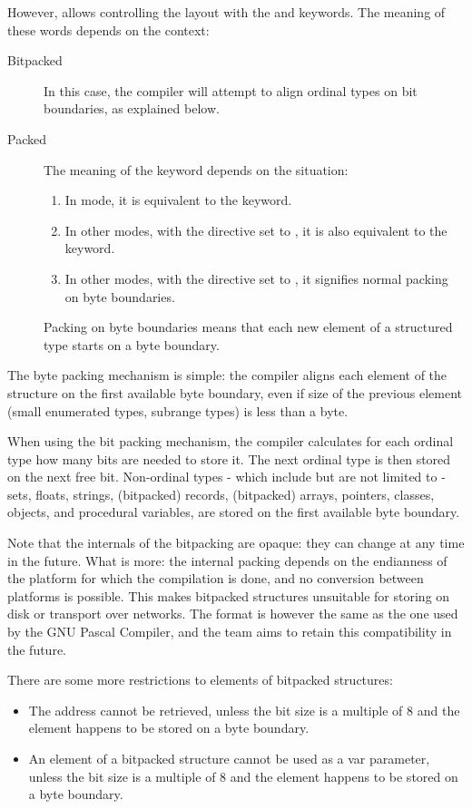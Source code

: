 However, \fpc allows controlling the layout with the  and
 keywords. The meaning of these words depends on the context:
\begin{description}
\item[Bitpacked] In this case, the compiler will attempt to align ordinal
types on bit boundaries, as explained below.
\item[Packed] The meaning of the  keyword depends on the
situation:
\begin{enumerate}
\item In  mode, it is equivalent to the  keyword.
\item In other modes, with the  directive set to ,
it is also equivalent to the  keyword.
\item In other modes, with the  directive set to ,
it signifies normal packing on byte boundaries.
\end{enumerate}
Packing on byte boundaries means that each new element of a structured type
starts on a byte boundary.
\end{description}

The byte packing mechanism is simple: the compiler aligns each element of
the structure on the first available byte boundary, even if size of the
previous element (small enumerated types, subrange types) is less than a
byte.

When using the bit packing mechanism, the compiler calculates for each
ordinal type how many bits are needed to store it. The next ordinal type
is then stored on the next free bit. Non-ordinal types - which include but
are not limited to - sets, floats, strings, (bitpacked) records, (bitpacked)
arrays, pointers, classes, objects, and procedural variables, are stored
on the first available byte boundary.

Note that the internals of the bitpacking are opaque: they can change
at any time in the future. What is more: the internal packing depends
on the endianness of the platform for which the compilation is done,
and no conversion between platforms is possible. This makes bitpacked
structures unsuitable for storing on disk or transport over networks.
The format is however the same as the one used by the GNU Pascal
Compiler, and the \fpc team aims to retain this compatibility in the future.

There are some more restrictions to elements of bitpacked structures:
\begin{itemize}
\item The address cannot be retrieved, unless the bit size is a multiple of
8 and the element happens to be stored on a byte boundary.
\item An element of a bitpacked structure cannot be used as a var parameter,
unless the bit size is a multiple of 8 and the element happens to be stored 
on a byte boundary.
\end{itemize}

